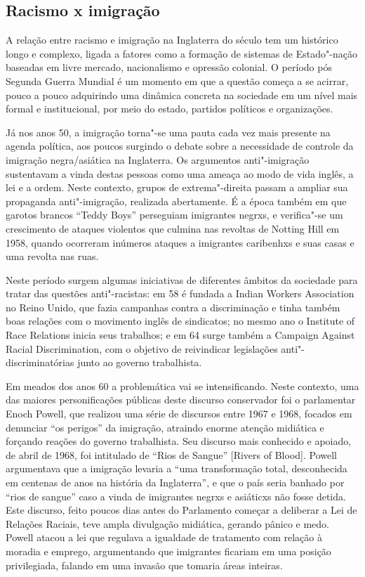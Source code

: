 \subsection{Racismo x imigração}

A relação entre racismo e imigração na Inglaterra do século  tem um histórico longo e complexo, ligada a fatores como a formação de sistemas de Estado"-nação baseadas em livre mercado, nacionalismo e opressão colonial. O período pós Segunda Guerra Mundial é um momento em que a questão começa a se acirrar, pouco a pouco adquirindo uma dinâmica concreta na sociedade em um nível mais formal e institucional, por meio do estado, partidos políticos e organizações.

Já nos anos 50, a imigração torna"-se uma pauta cada vez mais presente na agenda política, aos poucos surgindo o debate sobre a necessidade de controle da imigração negra/asiática na Inglaterra. Os argumentos anti"-imigração sustentavam a vinda destas pessoas como uma ameaça ao modo de vida inglês, a lei e a ordem. Neste contexto, grupos de extrema"-direita passam a ampliar sua propaganda anti"-imigração, realizada abertamente. É a época também em que garotos brancos ``Teddy Boys'' perseguiam imigrantes negrxs, e verifica"-se um crescimento de ataques violentos que culmina nas revoltas de Notting Hill em 1958, quando ocorreram inúmeros ataques a imigrantes caribenhxs e suas casas e uma revolta nas ruas.

Neste período surgem algumas iniciativas de diferentes âmbitos da sociedade para tratar das questões anti"-racistas: em 58 é fundada a Indian Workers Association no Reino Unido, que fazia campanhas contra a discriminação e tinha também boas relações com o movimento inglês de sindicatos; no mesmo ano o Institute of Race Relations inicia seus trabalhos; e em 64 surge também a Campaign Against Racial Discrimination, com o objetivo de reivindicar legislações anti"-discriminatórias junto ao governo trabalhista.

Em meados dos anos 60 a problemática vai se intensificando. Neste contexto, uma das maiores personificações públicas deste discurso conservador foi o parlamentar Enoch Powell, que realizou uma série de discursos entre 1967 e 1968, focados em denunciar ``os perigos'' da imigração, atraindo enorme atenção midiática e forçando reações do governo trabalhista. Seu discurso mais conhecido e apoiado, de abril de 1968, foi intitulado de ``Rios de Sangue'' [Rivers of Blood]. Powell argumentava que a imigração levaria a ``uma transformação total, desconhecida em centenas de anos na história da Inglaterra'', e que o país seria banhado por ``rios de sangue'' caso a vinda de imigrantes negrxs e asiáticxs não fosse detida. Este discurso, feito poucos dias antes do Parlamento começar a deliberar a Lei de Relações Raciais, teve ampla divulgação midiática, gerando pânico e medo. Powell atacou a lei que regulava a igualdade de tratamento com relação à moradia e emprego, argumentando que imigrantes ficariam em uma posição privilegiada, falando em uma invasão que tomaria áreas inteiras.

